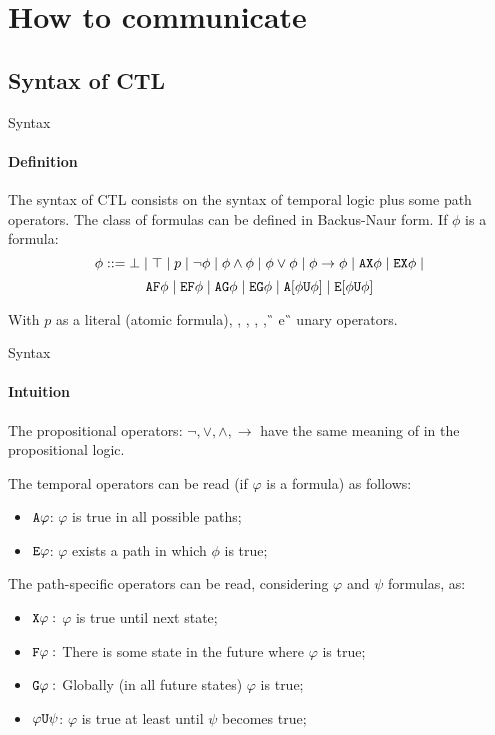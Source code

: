 \section{How to communicate}
\subsection{Syntax of CTL}
\begin{frame}{Syntax}
	\framesubtitle{Definition}
	The syntax of CTL consists on the syntax of temporal logic plus some path operators. The class of formulas can be defined in Backus-Naur form. If $\phi$ is a formula: \pause
	$$\phi ::= \bot \; | \; \top \; | \; p \; | \; \neg \phi \; | \; \phi \land \phi \; | \; \phi \lor \phi \; | \; \phi \to \phi \; | \; \texttt{A}\texttt{X} \phi \; | \; \texttt{E}\texttt{X} \phi \; | $$
	$$\texttt{A}\texttt{F} \phi \; | \; \texttt{E}\texttt{F} \phi \; | \; \texttt{A}\texttt{G} \phi \; | \; \texttt{E}\texttt{G} \phi \; | \; \texttt{A}[\phi \texttt{U} \phi] \; | \; \texttt{E}[\phi \texttt{U} \phi]$$\pause
	
	With $p$ as a literal (atomic formula), \A\X, \E\X, \A\F, \E\F, \A\G \, e \E\G \, unary operators.
	
\end{frame}

\begin{frame}{Syntax}
	\framesubtitle{Intuition}
	The propositional operators: $\neg, \lor, \land, \to$ have the same meaning of in the propositional logic.\pause
	
	The temporal operators can be read (if $\varphi$ is a formula) as follows: \pause
	\begin{itemize}
		\item 
		{
			$\texttt{A} \varphi$: $\varphi$ is true in all possible paths;
			\pause
		}
		\item 
		{
			$\texttt{E} \varphi$: $\varphi$ exists a path in which $\phi$ is true;
			\pause
		}
	\end{itemize}
	
	The path-specific operators can be read, considering $\varphi$ and $\psi$ formulas, as: \pause
	\begin{itemize}
		\item 
		{
			$\texttt{X} \varphi:$ $\varphi$ is  true until next state;
			\pause
		}
		\item 
		{
			$\texttt{F} \varphi:$ There is some state in the future where $\varphi$ is true;
			\pause
		}
		\item
		{
			$\texttt{G} \varphi: $ Globally (in all future states) $\varphi$ is true;
			\pause
		}
		\item
		{
			$\varphi \texttt{U} \psi$: $\varphi$ is true at least until $\psi$ becomes true;	
		}
	\end{itemize}
	
\end{frame}

